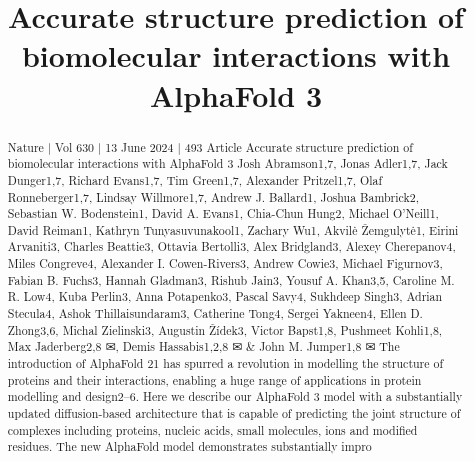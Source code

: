 \title{Accurate structure prediction of biomolecular interactions with AlphaFold 3}

\maketitle

\begin{abstract}
Nature | Vol 630 | 13 June 2024 | 493 Article Accurate structure prediction of biomolecular interactions with AlphaFold 3 Josh Abramson1,7, Jonas Adler1,7, Jack Dunger1,7, Richard Evans1,7, Tim Green1,7, Alexander Pritzel1,7, Olaf Ronneberger1,7, Lindsay Willmore1,7, Andrew J. Ballard1, Joshua Bambrick2, Sebastian W. Bodenstein1, David A. Evans1, Chia-Chun Hung2, Michael O’Neill1, David Reiman1, Kathryn Tunyasuvunakool1, Zachary Wu1, Akvilė Žemgulytė1, Eirini Arvaniti3, Charles Beattie3, Ottavia Bertolli3, Alex Bridgland3, Alexey Cherepanov4, Miles Congreve4, Alexander I. Cowen-Rivers3, Andrew Cowie3, Michael Figurnov3, Fabian B. Fuchs3, Hannah Gladman3, Rishub Jain3, Yousuf A. Khan3,5, Caroline M. R. Low4, Kuba Perlin3, Anna Potapenko3, Pascal Savy4, Sukhdeep Singh3, Adrian Stecula4, Ashok Thillaisundaram3, Catherine Tong4, Sergei Yakneen4, Ellen D. Zhong3,6, Michal Zielinski3, Augustin Žídek3, Victor Bapst1,8, Pushmeet Kohli1,8, Max Jaderberg2,8 ✉, Demis Hassabis1,2,8 ✉ \& John M. Jumper1,8 ✉ The introduction of AlphaFold 21 has spurred a revolution in modelling the structure of proteins and their interactions, enabling a huge range of applications in protein modelling and design2–6. Here we describe our AlphaFold 3 model with a substantially updated diffusion-based architecture that is capable of predicting the joint structure of complexes including proteins, nucleic acids, small molecules, ions and modified residues. The new AlphaFold model demonstrates substantially impro
\end{abstract}

